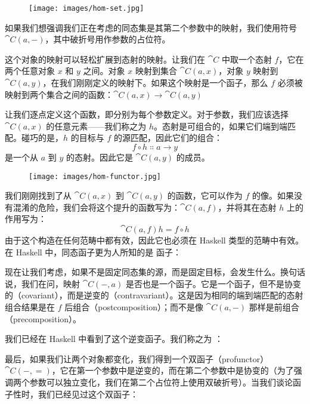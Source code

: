 \begin{figure}[H]
  \centering
  \texttt{[image: images/hom-set.jpg]}
\end{figure}

\noindent
如果我们想强调我们正在考虑的同态集是其第二个参数中的映射，我们使用符号 $\cat{C}(a, -)$，其中破折号用作参数的占位符。

这个对象的映射可以轻松扩展到态射的映射。让我们在 $\cat{C}$ 中取一个态射 $f$，它在两个任意对象 $x$ 和 $y$ 之间。对象 $x$ 映射到集合 $\cat{C}(a, x)$，对象 $y$ 映射到 $\cat{C}(a, y)$，在我们刚刚定义的映射下。如果这个映射是一个函子，那么 $f$ 必须被映射到两个集合之间的函数：$\cat{C}(a, x) \to \cat{C}(a, y)$

让我们逐点定义这个函数，即分别为每个参数定义。对于参数，我们应该选择 $\cat{C}(a, x)$ 的任意元素——我们称之为 $h$。态射是可组合的，如果它们端到端匹配。碰巧的是，$h$ 的目标与 $f$ 的源匹配，因此它们的组合：
\[f \circ h \Colon a \to y\]
是一个从 $a$ 到 $y$ 的态射。因此它是 $\cat{C}(a, y)$ 的成员。

\begin{figure}[H]
  \centering
  \texttt{[image: images/hom-functor.jpg]}
\end{figure}

\noindent
我们刚刚找到了从 $\cat{C}(a, x)$ 到 $\cat{C}(a, y)$ 的函数，它可以作为 $f$ 的像。如果没有混淆的危险，我们会将这个提升的函数写为：$\cat{C}(a, f)$，并将其在态射 $h$ 上的作用写为：
\[\cat{C}(a, f) h = f \circ h\]
由于这个构造在任何范畴中都有效，因此它也必须在 Haskell 类型的范畴中有效。在 Haskell 中，同态函子更为人所知的是  函子：


现在让我们考虑，如果不是固定同态集的源，而是固定目标，会发生什么。换句话说，我们在问，映射 $\cat{C}(-, a)$ 是否也是一个函子。它是一个函子，但不是协变的（covariant），而是逆变的（contravariant）。这是因为相同的端到端匹配的态射组合结果是在 $f$ 后组合（postcomposition）；而不是像 $\cat{C}(a, -)$ 那样是前组合（precomposition）。

我们已经在 Haskell 中看到了这个逆变函子。我们称之为 ：


最后，如果我们让两个对象都变化，我们得到一个双函子（profunctor）$\cat{C}(-, =)$，它在第一个参数中是逆变的，而在第二个参数中是协变的（为了强调两个参数可以独立变化，我们在第二个占位符上使用双破折号）。当我们谈论函子性时，我们已经见过这个双函子：

